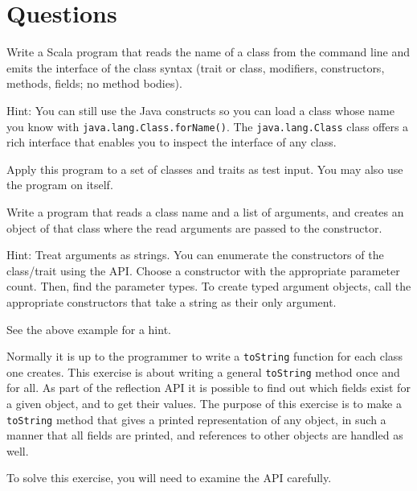 \documentclass[11pt,a4paper,answers]{exam}
\begin{document}
\newpage

\section*{Questions}

\begin{questions}
\question
Write a Scala program that reads the name of a class from the command line and emits the interface of the class 
syntax (trait or class, modifiers, constructors, methods, fields; no method bodies). 

Hint: You can still use the Java constructs so you can load a class whose name you know with \verb!java.lang.Class.forName()!. 
The \verb!java.lang.Class! class offers a rich interface that enables you to inspect the interface of any class.

Apply this program to a set of classes and traits as test input. You may also use the program on itself.

\question
Write a program that reads a class name and a list of arguments, 
and creates an object of that class where the read arguments are passed to the constructor.

Hint: Treat arguments as strings. You can enumerate the constructors of the class/trait using the API.
Choose a constructor with the appropriate parameter count. 
Then, find the parameter types. To create typed argument objects, call the appropriate constructors 
that take a string as their only argument. 

See the above example for a hint.

\question
Normally it is up to the programmer to write a \verb!toString! function for each class one creates. 
This exercise is about writing a general \verb!toString! method once and for all. 
As part of the reflection API it is possible to find out which fields exist for a given object, 
and to get their values. The purpose of this exercise is to make a \verb!toString! method that gives a printed 
representation of any object, in such a manner that all fields are printed, 
and references to other objects are handled as well. 

To solve this exercise, you will need to examine the API carefully. 
\end{questions}
\end{document}
